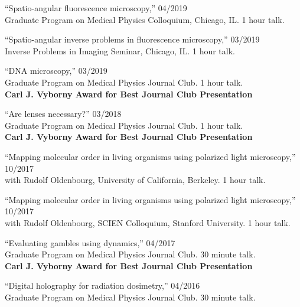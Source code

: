 \documentclass[12pt,letterpaper]{article}
\begin{document}
\begin{benumerate}{8}
\item {``Spatio-angular fluorescence microscopy,'' \hfill 04/2019\\
     Graduate Program on Medical Physics Colloquium, Chicago, IL. 1 hour talk.}
  
\item {``Spatio-angular inverse problems in fluorescence microscopy,'' \hfill 03/2019\\
     Inverse Problems in Imaging Seminar, Chicago, IL. 1 hour talk.}

\item {``DNA microscopy,'' \hfill 03/2019\\
    Graduate Program on Medical Physics Journal Club. 1 hour talk.\\
    \textbf{Carl J. Vyborny Award for Best Journal Club Presentation}}
  
\item {``Are lenses necessary?'' \hfill 03/2018\\
    Graduate Program on Medical Physics Journal Club. 1 hour talk.\\
    \textbf{Carl J. Vyborny Award for Best Journal Club Presentation}}
  
\item {``Mapping molecular order in living organisms using polarized light microscopy,'' \hfill 10/2017\\
    with Rudolf Oldenbourg, University of California, Berkeley. 1 hour talk.}
  
\item {``Mapping molecular order in living organisms using polarized light microscopy,'' \hfill 10/2017\\
    with Rudolf Oldenbourg, SCIEN Colloquium, Stanford University. 1 hour talk.}
  
\item {``Evaluating gambles using dynamics,'' \hfill 04/2017\\
    Graduate Program on Medical Physics Journal Club. 30 minute talk.\\
    \textbf{Carl J. Vyborny Award for Best Journal Club Presentation}}

\item {``Digital holography for radiation dosimetry,'' \hfill 04/2016\\
    Graduate Program on Medical Physics Journal Club. 30 minute talk.}
\end{benumerate}
\end{document}
